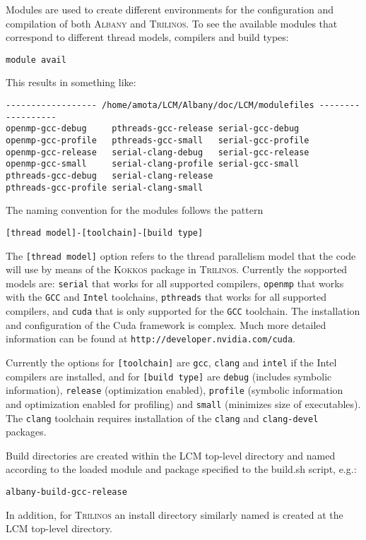 \documentclass{article}
\newcommand{\trilinos}{\textsc{Trilinos}}
\newcommand{\albany}{\textsc{Albany}}
\newcommand{\lcm}{\textsc{LCM}}
\newcommand{\kokkos}{\textsc{Kokkos}}
\begin{document}
Modules are used to create different environments for the
configuration and compilation of both \albany{} and \trilinos{}. To
see the available modules that correspond to different thread models,
compilers and build types:
\begin{verbatim}
module avail
\end{verbatim}
This results in something like:
\begin{verbatim}
------------------ /home/amota/LCM/Albany/doc/LCM/modulefiles ------------------
openmp-gcc-debug     pthreads-gcc-release serial-gcc-debug
openmp-gcc-profile   pthreads-gcc-small   serial-gcc-profile
openmp-gcc-release   serial-clang-debug   serial-gcc-release
openmp-gcc-small     serial-clang-profile serial-gcc-small
pthreads-gcc-debug   serial-clang-release
pthreads-gcc-profile serial-clang-small
\end{verbatim}
The naming convention for the modules follows the pattern
\begin{verbatim}
[thread model]-[toolchain]-[build type]
\end{verbatim}
The \verb+[thread model]+ option refers to the thread parallelism
model that the code will use by means of the \kokkos{} package in
\trilinos{}. Currently the sopported models are: \verb+serial+ that
works for all supported compilers, \verb+openmp+ that works with the
\verb+GCC+ and \verb+Intel+ toolchains, \verb+pthreads+ that works for
all supported compilers, and \verb+cuda+ that is only supported for
the \verb+GCC+ toolchain. The installation and configuration of the
Cuda framework is complex. Much more detailed information can be found
at \verb+http://developer.nvidia.com/cuda+.

Currently the options for \verb+[toolchain]+ are \verb+gcc+,
\verb+clang+ and \verb+intel+ if the Intel compilers are installed,
and for \verb+[build type]+ are \verb+debug+ (includes symbolic
information), \verb+release+ (optimization enabled), \verb+profile+
(symbolic information and optimization enabled for profiling) and
\verb+small+ (minimizes size of executables). The \verb+clang+
toolchain requires installation of the \verb+clang+ and
\verb+clang-devel+ packages.

Build directories are created within the \lcm{} top-level directory
and named according to the loaded module and package specified to the
build.sh script, e.g.:
\begin{verbatim}
albany-build-gcc-release
\end{verbatim}
In addition, for \trilinos{} an install directory similarly named is
created at the \lcm{} top-level directory.
\end{document}
